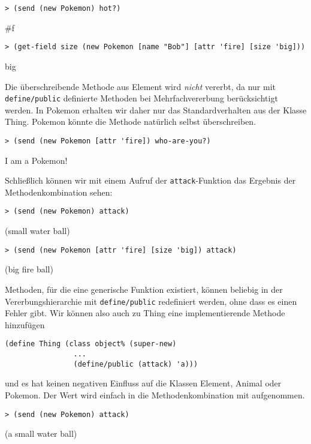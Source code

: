 \begin{lstlisting}
> (send (new Pokemon) hot?)
\end{lstlisting}
{\routput \#f}

\begin{lstlisting}
> (get-field size (new Pokemon [name "Bob"] [attr 'fire] [size 'big]))
\end{lstlisting}
{\rsymbol big}

Die überschreibende Methode aus Element wird \emph{nicht} vererbt, da nur mit \texttt{define/public} definierte Methoden bei Mehrfachvererbung berücksichtigt werden. In Pokemon erhalten wir daher nur das Standardverhalten aus der Klasse Thing. Pokemon könnte die Methode natürlich selbst überschreiben.

\begin{lstlisting}
> (send (new Pokemon [attr 'fire]) who-are-you?)
\end{lstlisting}
{\routput {\qq}I am a Pokemon!\qq}

Schließlich können wir mit einem Aufruf der \texttt{attack}-Funktion das Ergebnis der Methodenkombination sehen:

\begin{lstlisting}
> (send (new Pokemon) attack)
\end{lstlisting}
{\rsymbol (small water ball)}

\begin{lstlisting}
> (send (new Pokemon [attr 'fire] [size 'big]) attack)
\end{lstlisting}
{\rsymbol (big fire ball)}

Methoden, für die eine generische Funktion existiert, können beliebig in der Vererbungshierarchie mit \texttt{define/public} redefiniert werden, ohne dass es einen Fehler gibt. Wir können also auch zu Thing eine implementierende Methode hinzufügen

\begin{lstlisting}
(define Thing (class object% (super-new)
                ...
                (define/public (attack) 'a)))
\end{lstlisting}

und es hat keinen negativen Einfluss auf die Klassen Element, Animal oder Pokemon. Der Wert wird einfach in die Methodenkombination mit aufgenommen.

\begin{lstlisting}
> (send (new Pokemon) attack)
\end{lstlisting}
{\rsymbol (a small water ball)}

